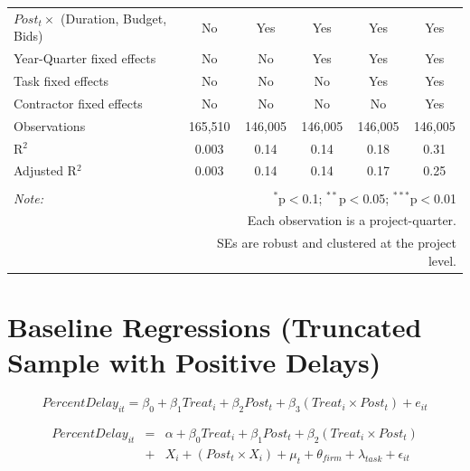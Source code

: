\documentclass[
]{article}
\begin{document}
\begin{table}[H]
\begin{tabular}{@{\extracolsep{-2pt}}lccccc}
$Post_t \times$  (Duration, Budget, Bids) & No & Yes & Yes & Yes & Yes \\ 
Year-Quarter fixed effects & No & No & Yes & Yes & Yes \\ 
Task fixed effects & No & No & No & Yes & Yes \\ 
Contractor fixed effects & No & No & No & No & Yes \\ 
Observations & 165,510 & 146,005 & 146,005 & 146,005 & 146,005 \\ 
R$^{2}$ & 0.003 & 0.14 & 0.14 & 0.18 & 0.31 \\ 
Adjusted R$^{2}$ & 0.003 & 0.14 & 0.14 & 0.17 & 0.25 \\ 
\hline 
\hline \\[-1.8ex] 
\textit{Note:}  & \multicolumn{5}{r}{$^{*}$p$<$0.1; $^{**}$p$<$0.05; $^{***}$p$<$0.01} \\ 
 & \multicolumn{5}{r}{Each observation is a project-quarter.} \\ 
 & \multicolumn{5}{r}{SEs are robust and clustered at the project level.} \\ 
\end{tabular} 
\end{table}

\hypertarget{baseline-regressions-truncated-sample-with-positive-delays}{%
\section{Baseline Regressions (Truncated Sample with Positive
Delays)}\label{baseline-regressions-truncated-sample-with-positive-delays}}

\[ PercentDelay_{it} = \beta_0 + \beta_1 Treat_i + \beta_2 Post_t + \beta_3 (Treat_i \times Post_t) + e_{it}\]

\[ \begin{aligned} PercentDelay_{it} &=& \alpha+\beta_0 Treat_i + \beta_1 Post_t + \beta_2 (Treat_i \times Post_t)\\
&+&  X_i + (Post_t \times X_i) + \mu_t + \theta_{firm} + \lambda_{task}+ \epsilon_{it}
\end{aligned}\]
\end{document}
